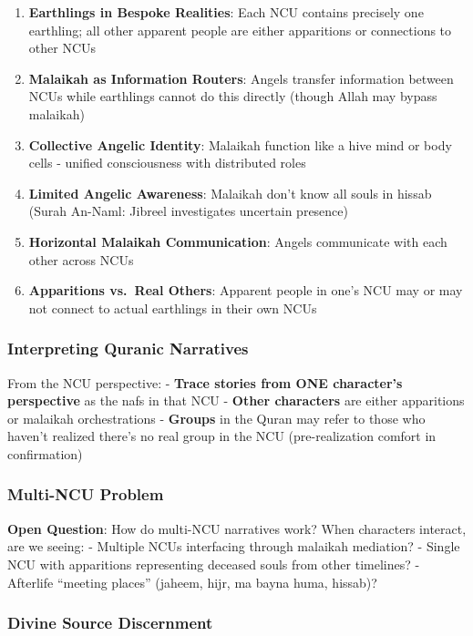 \documentclass[12pt,a4paper]{article}
\begin{document}
\begin{enumerate}
\def\labelenumi{\arabic{enumi}.}
\item
  \textbf{Earthlings in Bespoke Realities}: Each NCU contains precisely
  one earthling; all other apparent people are either apparitions or
  connections to other NCUs
\item
  \textbf{Malaikah as Information Routers}: Angels transfer information
  between NCUs while earthlings cannot do this directly (though Allah
  may bypass malaikah)
\item
  \textbf{Collective Angelic Identity}: Malaikah function like a hive
  mind or body cells - unified consciousness with distributed roles
\item
  \textbf{Limited Angelic Awareness}: Malaikah don't know all souls in
  hissab (Surah An-Naml: Jibreel investigates uncertain presence)
\item
  \textbf{Horizontal Malaikah Communication}: Angels communicate with
  each other across NCUs
\item
  \textbf{Apparitions vs.~Real Others}: Apparent people in one's NCU may
  or may not connect to actual earthlings in their own NCUs
\end{enumerate}

\subsubsection{Interpreting Quranic
Narratives}\label{interpreting-quranic-narratives}

From the NCU perspective: - \textbf{Trace stories from ONE character's
perspective} as the nafs in that NCU - \textbf{Other characters} are
either apparitions or malaikah orchestrations - \textbf{Groups} in the
Quran may refer to those who haven't realized there's no real group in
the NCU (pre-realization comfort in confirmation)

\subsubsection{Multi-NCU Problem}\label{multi-ncu-problem}

\textbf{Open Question}: How do multi-NCU narratives work? When
characters interact, are we seeing: - Multiple NCUs interfacing through
malaikah mediation? - Single NCU with apparitions representing deceased
souls from other timelines? - Afterlife ``meeting places'' (jaheem,
hijr, ma bayna huma, hissab)?

\subsubsection{Divine Source
Discernment}\label{divine-source-discernment}
\end{document}
